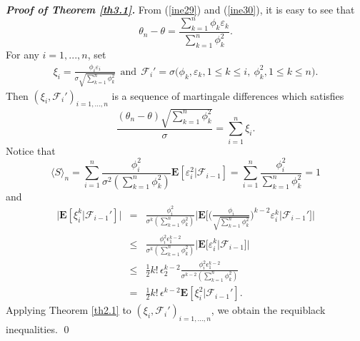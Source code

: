 \documentclass{gSTA2e}
\theoremstyle{plain}
\theoremstyle{definition}
\theoremstyle{remark}
\begin{document}
\noindent \emph{\textbf{Proof of Theorem \ref{th3.1}.}} From (\ref{ine29}) and (\ref{ine30}), it is easy to see that
\begin{equation}
\theta_n -\theta = \frac{\sum_{k=1}^n \phi_{k} \varepsilon_k}{\sum_{k=1}^n \phi_{k}^2}. \nonumber
\end{equation}
For any $i=1,...,n$, set
\begin{eqnarray*}
 \xi_i= \frac{ \phi_{i} \varepsilon_i}{ \sigma \sqrt{\sum_{k=1}^n \phi_{k}^2}}\ \  \textrm{and} \ \ \mathcal{F}_{i}' = \sigma \big( \phi_{k}, \varepsilon_k, 1\leq k\leq i,\  \phi_{k}^2, 1\leq k\leq n \big).
\end{eqnarray*}
Then $(\xi_i, \mathcal{F}_{i}')_{i=1,...,n}$ is a sequence of martingale differences which satisfies
$$ \frac{(\theta_n -\theta)\sqrt{\sum_{k=1}^n \phi_{k}^2} } { \sigma}  =\sum_{i=1}^n\xi_i.$$
Notice that$$\langle S\rangle_n = \sum_{i=1}^{n} \frac{ \phi_{i}^2 }{ \sigma^2 (\sum_{k=1}^n \phi_{k}^2)} \mathbf{E}[\varepsilon_i^2 | \mathcal{F}_{i-1} ] =\sum_{i=1}^{n} \frac{ \phi_{i}^2 }{  \sum_{k=1}^n \phi_{k}^2 }  = 1 $$
and
\begin{eqnarray} \label{fgdsasas}
\Big|\mathbf{E}[\xi_i^k | \mathcal{F}_{i-1}' ]\Big| &=&  \frac{ \phi_{i}^2 }{ \sigma^k (\sum_{k=1}^n \phi_{k}^2)} \Bigg|\mathbf{E}\bigg[ \Big(\frac{ \phi_{i}  }{  \sqrt{\sum_{k=1}^n \phi_{k}^2}}\Big)^{k-2} \varepsilon_i^k  \bigg| \mathcal{F}_{i-1}' \bigg]\Bigg| \nonumber\\
&\leq&  \frac{ \phi_{i}^2 \epsilon_1^{k-2} }{ \sigma^k (\sum_{k=1}^n \phi_{k}^2)} \Big|\mathbf{E} \big[   \varepsilon_i^k  \big| \mathcal{F}_{i-1}  \big]\Big| \nonumber\\
&\leq& \frac12 k! \, \epsilon_2^{k-2} \frac{ \phi_{i}^2 \epsilon_1^{k-2} }{ \sigma^{k-2}(\sum_{k=1}^n \phi_{k}^2)} \nonumber\\
&=&  \frac12 k! \, \epsilon ^{k-2} \mathbf{E}[\xi_i^2 | \mathcal{F}_{i-1} ']. \nonumber
 \end{eqnarray}
Applying Theorem
\ref{th2.1} to $(\xi_i, \mathcal{F}_{i}')_{i=1,...,n}$, we obtain the requiblack inequalities. \hfill\qed
\end{document}
